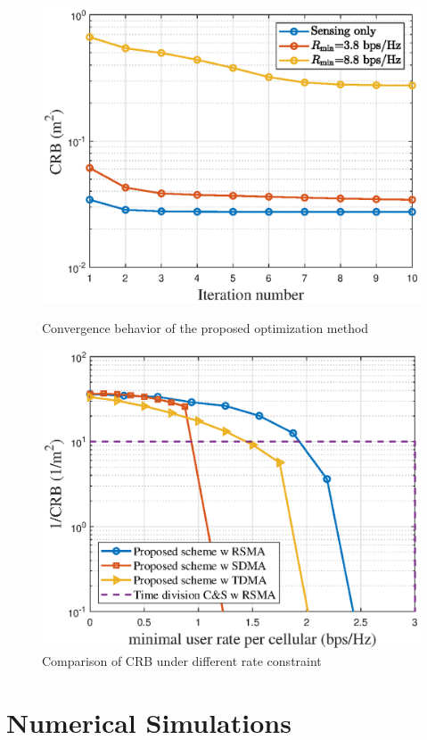 \documentclass[twocolumn,journal]{IEEEtran}
\begin{document}
\begin{figure}[htbp]
  \centering
  \begin{minipage}{0.3\textwidth}
    \centering
    \includegraphics[width=\linewidth]{figure/1_figConv.eps}
    \caption{Convergence behavior of the proposed optimization method}
    \label{fig:Conv}
  \end{minipage}
  \hfill
  \begin{minipage}{0.3\textwidth}
    \centering
    \includegraphics[width=\linewidth]{figure/2_figRate_CRB.eps}
    \caption{Comparison of CRB under different rate constraint}
    \label{fig:image2}
  \end{minipage}
\end{figure}
\section{Numerical Simulations}

\printbibliography 
\end{document}
